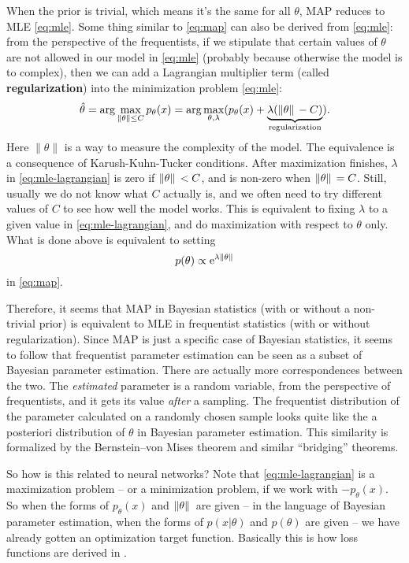 \documentclass[hyperref, a4paper, 12pt]{report}
\newcommand*{\ee}{\mathrm{e}}
\newcommand*{\argmax}{\arg\max}
\newcommand*{\concept}[1]{{\textbf{#1}}}
\begin{document}
When the prior is trivial, which means it's the same for all $\theta$,
MAP reduces to MLE \eqref{eq:mle}.
Some thing similar to \eqref{eq:map} can also be derived from \eqref{eq:mle}:
from the perspective of the frequentists,
if we stipulate that certain values of $\theta$ are not allowed in our model in \eqref{eq:mle}
(probably because otherwise the model is to complex),
then we can add a Lagrangian multiplier term (called \concept{regularization}) into the minimization problem \eqref{eq:mle}:
\begin{equation}
    \hat{\theta} = \argmax_{\|\theta\| \leq C} p_\theta(x) = \argmax_{\theta, \lambda} (p_\theta(x) + \underbrace{\lambda (\norm*{\theta} - C)}_{\text{regularization}}).
    \label{eq:mle-lagrangian}
\end{equation}
Here $\|\theta\|$ is a way to measure the complexity of the model.
The equivalence is a consequence of Karush-Kuhn-Tucker conditions.
After maximization finishes, $\lambda$ in \eqref{eq:mle-lagrangian} is zero if $\norm*{\theta} < C$,
and is non-zero when $\norm*{\theta} = C$.
Still, usually we do not know what $C$ actually is,
and we often need to try different values of $C$ to see how well the model works.
This is equivalent to fixing $\lambda$ to a given value in \eqref{eq:mle-lagrangian},
and do maximization with respect to $\theta$ only.
What is done above is equivalent to setting
\begin{equation}
    p(\theta) \propto \ee^{\lambda \norm*{\theta}}
\end{equation}
in \eqref{eq:map}.

Therefore, it seems that MAP in Bayesian statistics (with or without a non-trivial prior)
is equivalent to MLE in frequentist statistics (with or without regularization).
Since MAP is just a specific case of Bayesian statistics,
it seems to follow that frequentist parameter estimation can be seen as a subset of Bayesian parameter estimation.
There are actually more correspondences between the two.
The \emph{estimated} parameter is a random variable,
from the perspective of frequentists,
and it gets its value \emph{after} a sampling.
The frequentist distribution of the parameter calculated on a randomly chosen sample
looks quite like the a posteriori distribution of $\theta$ in Bayesian parameter estimation.
This similarity is formalized by the Bernstein–von Mises theorem and similar ``bridging'' theorems.

So how is this related to neural networks?
Note that \eqref{eq:mle-lagrangian} is a maximization problem -- or a minimization problem,
if we work with $- p_\theta(x)$.
So when the forms of $p_\theta(x)$ and $\norm*{\theta}$ are given 
-- in the language of Bayesian parameter estimation, when the forms of $p(x | \theta)$ and $p(\theta)$ are given --
we have already gotten an optimization target function.
Basically this is how loss functions are derived in .
\end{document}
